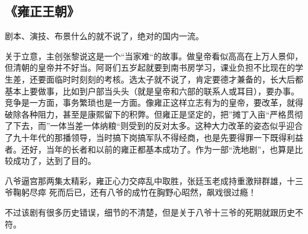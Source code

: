\subsection{《雍正王朝》}
剧本、演技、布景什么的就不说了，绝对的国内一流。
 
关于立意，主创张黎说这是一个“当家难“的故事。做皇帝看似高高在上万人景仰，但清朝的皇帝并不好当。阿哥们五岁起就要到南书房学习，课业负担不比现在的学生差，还要面临时时刻刻的考核。选太子就不说了，肯定要德才兼备的，长大后都基本上要做事，比如到户部当头头（就是皇帝和六部的联系人或耳目），要办事。竞争是一方面，事务繁琐也是一方面。像雍正这样立志有为的皇帝，要改革，就得破除各种阻力，甚至是康熙留下的积弊。但雍正是坚定的，把”摊丁入亩“严格贯彻了下去，而”一体当差一体纳粮“则受到的反对太多。这种大力改革的姿态似乎迎合了九十年代的那播领导，当时搞下岗搞军队不得经商，也是先要得罪一下既得利益者。还好，当年的长者和以前的雍正都基本成功了。作为一部“洗地剧”，也算是比较成功了，达到了目的。 

八爷逼宫那两集太精彩，雍正心力交瘁乱中取胜，张廷玉老成持重激辩群雄，十三爷鞠躬尽瘁 死而后已，还有八爷的成竹在胸野心昭然，飙戏很过瘾！ 

不过该剧有很多历史错误，细节的不清楚，但是关于八爷十三爷的死期就跟历史不符。